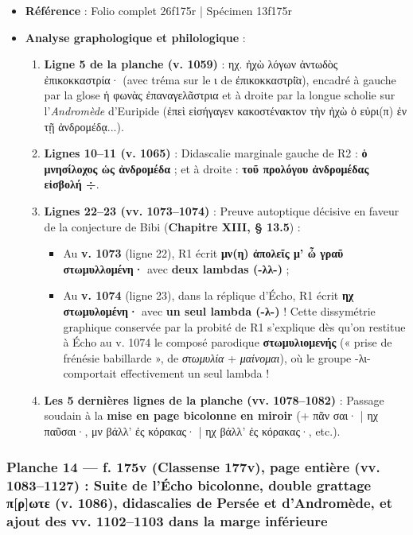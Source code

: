 \documentclass[11pt, a4paper, twoside]{article}
\renewcommand{\_}{\origunderscore\penalty0\relax}
\renewcommand{\texttt}[1]{#1}
\newcommand{\Run}{\textbf{R}\textsuperscript{1}}
\newcommand{\Rdeux}{\textbf{R}\textsuperscript{2}}
\newcommand{\Bibi}{\textit{Bibi}}
\newcommand{\inRas}[2]{[\kern-0.15em[#1]\kern-0.15em]#2}
\def\Run{R1}%
\def\Rdeux{R2}%
\def\Bibi{Bibi}%
\def\inRas#1#2{[#1]#2}%
\begin{document}
\begin{itemize}[leftmargin=1.5em, itemsep=2pt]
  \item \textbf{Référence} : Folio complet \texttt{26\_f175r} | Spécimen \texttt{13\_f175r}
  \item \textbf{Analyse graphologique et philologique} :
  \begin{enumerate}[leftmargin=1.6em, itemsep=2pt]
  \item \textbf{Ligne 5 de la planche (\texttt{v. 1059})} : \texttt{ηχ. ἠχὼ λόγων ἀντωδὸς ἐπικοκκαστρία·} (avec tréma sur le ι de \texttt{ἐπικοκκαστρί̈α}), encadré à gauche par la glose \texttt{ἡ φωνὰς ἐπαναγελᾶστρια} et à droite par la longue scholie sur l'\textit{Andromède} d'Euripide (\texttt{ἐπεὶ εἰσήγαγεν κακοστένακτον τὴν ἠχὼ ὁ εὐρι(π) ἐν τῇ ἀνδρομέδᾳ...}).
  \item \textbf{Lignes 10–11 (\texttt{v. 1065})} : Didascalie marginale gauche de \Rdeux{} : \textbf{\texttt{ὁ μνησίλοχος ὡς ἀνδρομέδα}} ; et à droite : \textbf{\texttt{τοῦ προλόγου ἀνδρομέδας εἰσβολή ÷}}.
  \item \textbf{Lignes 22–23 (\texttt{vv. 1073–1074})} : Preuve autoptique décisive en faveur de la conjecture de \Bibi{} (\textbf{Chapitre XIII, § 13.5}) :
  \begin{itemize}[leftmargin=1.5em, itemsep=2pt]
    \item Au \textbf{v. 1073} (ligne 22), \Run{} écrit \textbf{\texttt{μν(η) ἀπολεῖς μ' ὦ γραῦ στωμυλλομένη·}} avec \textbf{deux lambdas (\texttt{-λλ-})} ;
    \item Au \textbf{v. 1074} (ligne 23), dans la réplique d'Écho, \Run{} écrit \textbf{\texttt{ηχ στωμυλομένη·}} avec \textbf{un seul lambda (\texttt{-λ-})} ! Cette dissymétrie graphique conservée par la probité de \Run{} s'explique dès qu'on restitue à Écho au v. 1074 le composé parodique \textbf{\texttt{στωμυλιομενής}} (« prise de frénésie babillarde », de \textit{στωμυλία} + \textit{μαίνομαι}), où le groupe -λι- comportait effectivement un seul lambda !
  \end{itemize}
  \item \textbf{Les 5 dernières lignes de la planche (\texttt{vv. 1078–1082})} : Passage soudain à la \textbf{mise en page bicolonne en miroir} (\texttt{+ πᾶν σαι· | ηχ παῦσαι·}, \texttt{μν βάλλ' ἐς κόρακας· | ηχ βάλλ' ἐς κόρακας·}, etc.).
  \end{enumerate}
\end{itemize}



\newpage
\subsubsection{Planche 14 — \texttt{f. 175v} (Classense \texttt{177v}), page entière (\texttt{vv. 1083–1127}) : Suite de l'Écho bicolonne, double grattage \texttt{π\inRas{ρ}{}ωτε} (\texttt{v. 1086}), didascalies de Persée et d'Andromède, et ajout des vv. 1102–1103 dans la marge inférieure}
\end{document}

